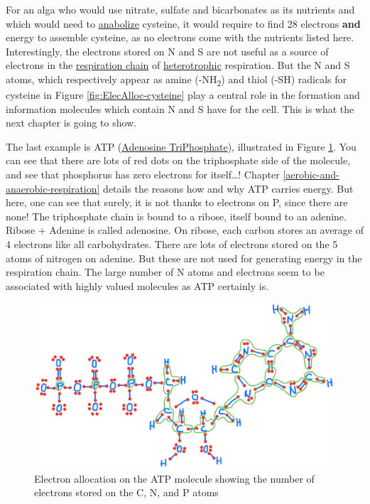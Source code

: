 \documentclass[]{book}
\theoremstyle{definition}
\theoremstyle{definition}
\theoremstyle{definition}
\theoremstyle{remark}
\begin{document}
For an alga who would use nitrate, sulfate and bicarbonates as its
nutrients and which would need to
\protect\hyperlink{anabolism}{anabolize} cysteine, it would require to
find 28 electrons \textbf{and} energy to assemble cysteine, as no
electrons come with the nutrients listed here. Interestingly, the
electrons stored on N and S are not useful as a source of electrons in
the \protect\hyperlink{aerobic-and-anaerobic-respiration}{respiration
chain} of \protect\hyperlink{trophic-names}{heterotrophic} respiration.
But the N and S atoms, which respectively appear as amine
(-NH\textsubscript{2}) and thiol (-SH) radicals for cysteine in Figure
\ref{fig:ElecAlloc-cysteine} play a central role in the formation and
information molecules which contain N and S have for the cell. This is
what the next chapter is going to show.

The last example is ATP (\protect\hyperlink{ATP}{Adenosine
TriPhosphate}), illustrated in Figure \ref{fig:ElecAlloc-ATP}. You can
see that there are lots of red dots on the triphosphate side of the
molecule, and see that phosphorus has zero electrons for itself\ldots{}!
Chapter \ref{aerobic-and-anaerobic-respiration} details the reasons how
and why ATP carries energy. But here, one can see that surely, it is not
thanks to electrons on P, since there are none! The triphosphate chain
is bound to a ribose, itself bound to an adenine. Ribose + Adenine is
called adenosine. On ribose, each carbon stores an average of 4
electrons like all carbohydrates. There are lots of electrons stored on
the 5 atoms of nitrogen on adenine. But these are not used for
generating energy in the respiration chain. The large number of N atoms
and electrons seem to be associated with highly valued molecules as ATP
certainly is.

\begin{figure}

{\centering \includegraphics[width=0.9\linewidth]{pictures/ElecAlloc_ATP} 

}

\caption{Electron allocation on the ATP molecule showing the number of electrons stored on the C, N, and P atoms }\label{fig:ElecAlloc-ATP}
\end{figure}
\end{document}
